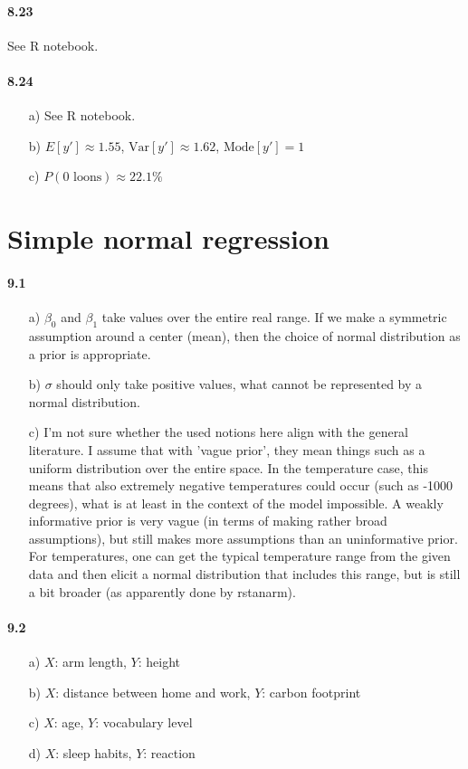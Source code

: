 \documentclass[fontsize=11pt,DIV=18,parskip=half]{scrartcl}
\begin{document}
\paragraph{8.23} See R notebook.

\paragraph{8.24}

\begin{enumerate}
\item[a)] See R notebook.
\item[b)] $E[y'] \approx 1.55$, $\text{Var}[y'] \approx	1.62$, $\text{Mode}[y'] = 1$
\item[c)] $P(\text{0 loons}) \approx 22.1\%$
\end{enumerate}

\section{Simple normal regression}

\paragraph{9.1} 
\begin{itemize}
\item[a)] $\beta_0$ and $\beta_1$ take values over the entire real range. If we make a symmetric assumption around a center (mean), then the choice of normal distribution as a prior is appropriate.
\item[b)] $\sigma$ should only take positive values, what cannot be represented by a normal distribution.
\item[c)] I'm not sure whether the used notions here align with the general literature. I assume that with 'vague prior', they mean things such as a uniform distribution over the entire space. In the temperature case, this means that also extremely negative temperatures could occur (such as -1000 degrees), what is at least in the context of the model impossible. A weakly informative prior is very vague (in terms of making rather broad assumptions), but still makes more assumptions than an uninformative prior. For temperatures, one can get the typical temperature range from the given data and then elicit a normal distribution that includes this range, but is still a bit broader (as apparently done by rstanarm).
\end{itemize}

\paragraph{9.2} 
\begin{itemize}
\item[a)] $X$: arm length, $Y$: height
\item[b)] $X$: distance between home and work, $Y$: carbon footprint
\item[c)] $X$: age, $Y$: vocabulary level
\item[d)] $X$: sleep habits, $Y$: reaction
\end{itemize}
\end{document}
